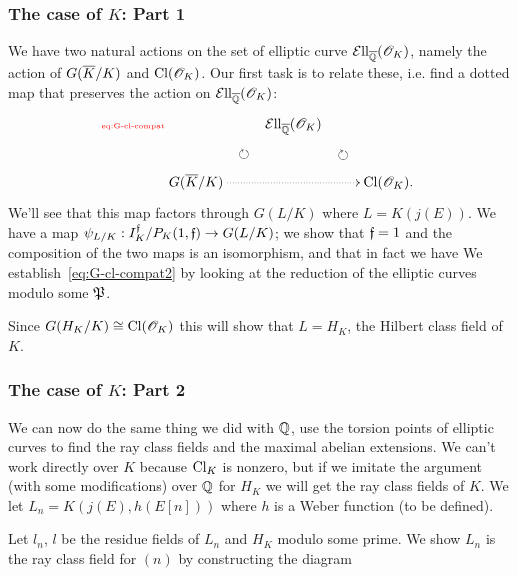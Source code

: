 \subsubsection{The case of $K$: Part 1}
We have two natural actions on the set of elliptic curve $\mathcal{E}{\rm{ll}}_{\overline{\mathbb{Q}}}(\mathscr{O}_K)$, namely the action of $G(\overline{K}/K)$ and $\operatorname{Cl}(\mathscr{O}_K)$. Our first task is to relate these, i.e. find a dotted map that preserves the action on $\mathcal{E}{\rm{ll}}_{\overline{\mathbb{Q}}}(\mathscr{O}_K)$:
\begin{equation}\llabel{eq:G-cl-compat}
\xymatrix{
&\Ell_{\ol{\Q}}(\sO_K)\ar@{}[ld]|-{\textstyle{\cir}}\ar@{}[rd]|-{\textstyle{\cir}}&\\
G(\ol K/K)\ar@{.>}[rr] &&\Cl(\sO_K).
}
\end{equation}
We'll see that this map factors through $G(L/K)$ where $L=K(j(E))$. 
We have a map $\psi_{L/K}:I_{K}^{\mathfrak{f}}/P_{K}(1,\mathfrak{f})\to G(L/K)$; we show that $\mathfrak{f}=1$ and the composition of the two maps is an isomorphism, and that in fact we have
\eeq
We establish~\eqref{eq:G-cl-compat2} by looking at the reduction of the elliptic curves modulo some $\mathfrak{P}$.

Since $G(H_K/K)\cong \operatorname{Cl}(\mathscr{O}_K)$ this will show that $L=H_K$, the Hilbert class field of $K$.
\subsubsection{The case of $K$: Part 2}
We can now do the same thing we did with $\mathbb{Q}$, use the torsion points of elliptic curves to find the ray class fields and the maximal abelian extensions. We can't work directly over $K$ because $\operatorname{Cl}_K$ is nonzero, but if we imitate the argument (with some modifications) over $\mathbb{Q}$ for $H_K$ we will get the ray class fields of $K$. We let $L_n=K(j(E),h(E[n]))$ where $h$ is a Weber function (to be defined).

Let $l_n$, $l$ be the residue fields of $L_n$ and $H_K$ modulo some prime. 
We show $L_n$ is the ray class field for $(n)$ by constructing the diagram
\eeq

